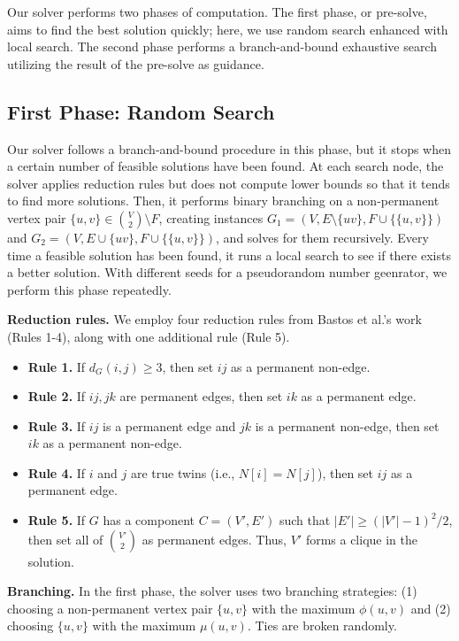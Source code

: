 \documentclass[a4paper,UKenglish,cleveref, autoref, thm-restate]{lipics-v2021}
\begin{document}
Our solver performs two phases of computation. The first phase, or pre-solve, aims to find the best solution quickly; here, we use random search enhanced with local search. The second phase performs a branch-and-bound exhaustive search utilizing the result of the pre-solve as guidance.

\subsection{First Phase: Random Search}

Our solver follows a branch-and-bound procedure in this phase, but it stops when a certain number of feasible solutions have been found. At each search node, the solver applies reduction rules but does not compute lower bounds so that it tends to find more solutions. Then, it performs binary branching on a non-permanent vertex pair $\{u,v\} \in \binom{V}{2} \setminus F$, creating instances $G_1=(V,E \setminus \{uv\}, F \cup \{\{u,v\}\})$ and $G_2 = (V,E \cup \{uv\}, F \cup \{\{u,v\}\})$, and solves for them recursively. Every time a feasible solution has been found, it runs a local search to see if there exists a better solution. With different seeds for a pseudorandom number geenrator, we perform this phase repeatedly.

\textbf{Reduction rules.} We employ four reduction rules from Bastos et al.'s work \cite{bastos2016efficient} (Rules 1-4), along with one additional rule (Rule 5).

\begin{itemize}
    \item \textbf{Rule 1.} If $d_G(i,j) \geq 3$, then set $ij$ as a permanent non-edge.
    \item \textbf{Rule 2.} If $ij, jk$ are permanent edges, then set $ik$ as a permanent edge.
    \item \textbf{Rule 3.} If $ij$ is a permanent edge and $jk$ is a permanent non-edge, then set $ik$ as a permanent non-edge.
    \item \textbf{Rule 4.} If $i$ and $j$ are true twins (i.e., $N[i]=N[j]$), then set $ij$ as a permanent edge.
    \item \textbf{Rule 5.} If $G$ has a component $C=(V', E')$ such that $|E'| \geq (|V'| - 1)^2 / 2$, then set all of $\binom{V'}{2}$ as permanent edges. Thus, $V'$ forms a clique in the solution.
\end{itemize}

\textbf{Branching.} In the first phase, the solver uses two branching strategies: (1) choosing a non-permanent vertex pair $\{u,v\}$ with the maximum $\phi(u,v)$ and (2) choosing $\{u,v\}$ with the maximum $\mu(u,v)$. Ties are broken randomly.
\end{document}
